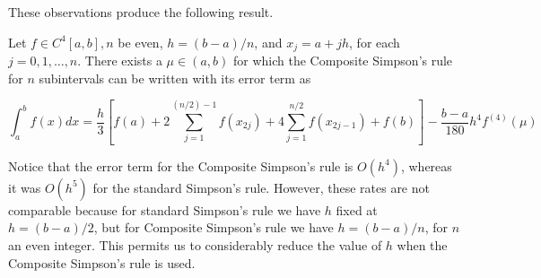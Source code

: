 \documentclass[12pt,a4paper]{article}
\begin{document}
These observations produce the following result.

\begin{theorem}
Let $f \in C^{4}[a, b], n$ be even, $h=(b-a) / n$, and $x_{j}=a+j h$, for each $j=0,1, \ldots, n$. There exists a $\mu \in(a, b)$ for which the Composite Simpson's rule for $n$ subintervals can be written with its error term as

$$
\int_{a}^{b} f(x) d x=\frac{h}{3}\left[f(a)+2 \sum_{j=1}^{(n / 2)-1} f\left(x_{2 j}\right)+4 \sum_{j=1}^{n / 2} f\left(x_{2 j-1}\right)+f(b)\right]-\frac{b-a}{180} h^{4} f^{(4)}(\mu)
$$
\end{theorem}

Notice that the error term for the Composite Simpson's rule is $O\left(h^{4}\right)$, whereas it was $O\left(h^{5}\right)$ for the standard Simpson's rule. However, these rates are not comparable because for standard Simpson's rule we have $h$ fixed at $h=(b-a) / 2$, but for Composite Simpson's rule we have $h=(b-a) / n$, for $n$ an even integer. This permits us to considerably reduce the value of $h$ when the Composite Simpson's rule is used.
%
%
\end{document}
